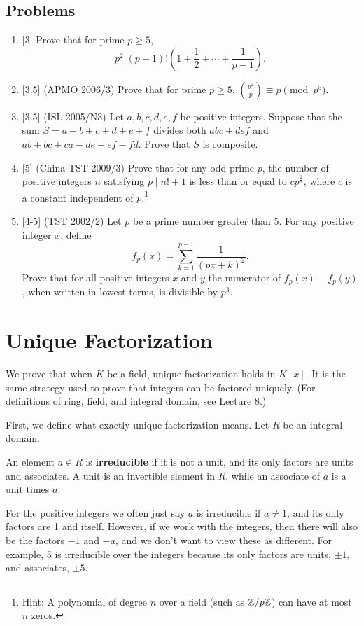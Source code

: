 \subsection{Problems}
\begin{enumerate}
\item{} [3] Prove that for prime $p\geq 5$,
\[p^2|(p-1)!\left(1+\frac{1}{2}+\cdots +\frac{1}{p-1}\right).\]

\item{} [3.5] (APMO 2006/3) Prove that for prime $p\geq 5$, $\binom{p^2}{p}\equiv p \pmod{p^5}$.

\item{} [3.5] (ISL 2005/N3) Let $a,b,c,d,e,f$ be positive integers. Suppose that the sum $S=a+b+c+d+e+f$ divides both $abc+def$ and $ab+bc+ca-de-ef-fd$. Prove that $S$ is composite.

\item{} [5] (China TST 2009/3) Prove that for any odd prime $p$, the number of positive integers $n$ satisfying $p\mid n!+1$ is less than or equal to $cp^{\frac{2}{3}}$, where $c$ is a constant independent of $p$.\footnote{Hint: A polynomial of degree $n$ over a field (such as $\mathbb{Z}/p\mathbb{Z}$) can have at most $n$ zeros.}

\item{} [4-5] (TST 2002/2) Let $p$ be a prime number greater than 5. For any positive integer $x$, define
\[f_p(x)=\sum_{k=1}^{p-1}\frac{1}{(px+k)^2}.\]
Prove that for all positive integers $x$ and $y$ the numerator of $f_p(x)-f_p(y)$, when written in lowest terms, is divisible by $p^3$.
\end{enumerate}

\section{Unique Factorization}
We prove that when $K$ be a field, unique factorization holds in $K[x]$. It is the same strategy used to prove that integers can be factored uniquely. (For definitions of ring, field, and integral domain, see Lecture 8.)

First, we define what exactly unique factorization means. Let $R$ be an integral domain.
\begin{df}
An element $a\in R$ is \textbf{irreducible} if it is not a unit, and its only factors are units and associates. A unit is an invertible element in $R$, while an associate of $a$ is a unit times $a$.
\end{df}
For the positive integers we often just say $a$ is irreducible if $a\neq 1$, and its only factors are 1 and itself. However, if we work with the integers, then there will also be the factors $-1$ and $-a$, and we don't want to view these as different. For example, 5 is irreducible over the integers because its only factors are units, $\pm1$, and associates, $\pm 5$.

